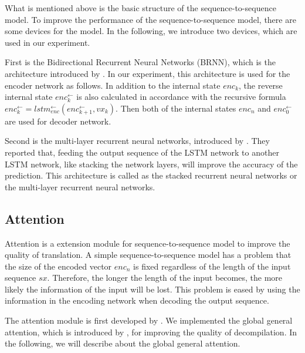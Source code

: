 \documentclass[senior,final,11pt]{iscs-thesis}
\begin{document}


What is mentioned above is the basic structure of the sequence-to-sequence model.
To improve the performance of the sequence-to-sequence model, there are some devices for the model.
In the following, we introduce two devices, which are used in our experiment.

First is the Bidirectional Recurrent Neural Networks (BRNN), which is the architecture introduced by \citet{BiRNN}.
In our experiment, this architecture is used for the encoder network as follows.
In addition to the internal state $ enc_{k} $, the reverse internal state $ enc_{k}^{\gets} $ is also calculated 
in accordance with the recursive formula $ enc_{k}^{\gets} = lstm_{enc}^{\gets}(enc_{k+1}^{\gets},vx_{k}) $.
Then both of the internal states $ enc_{n} $ and $ enc_{0}^{\gets} $ are used for decoder network.

Second is the multi-layer recurrent neural networks, introduced by \citet{multi_layer}.
They reported that, feeding the output sequence of the LSTM network to another LSTM network, like stacking the network layers, will improve the accuracy of the prediction.
This architecture is called as the stacked recurrent neural networks or the multi-layer recurrent neural networks.





\subsection{Attention}
Attention is a extension module for sequence-to-sequence model to improve the quality of translation. 
A simple sequence-to-sequence model has a problem that the size of the encoded vector $enc_{n}$ is fixed 
regardless of the length of the input sequence $sx$. 
Therefore, the longer the length of the input becomes, the more likely the information of the input will be lost.
This problem is eased by using the information in the encoding network when decoding the output sequence.

The attention module is first developed by \citet{attention_paper}.
We implemented the global general attention, which is introduced by \citet{dot_attention}, for improving the quality of decompilation.
In the following, we will describe about the global general attention.
\end{document}
